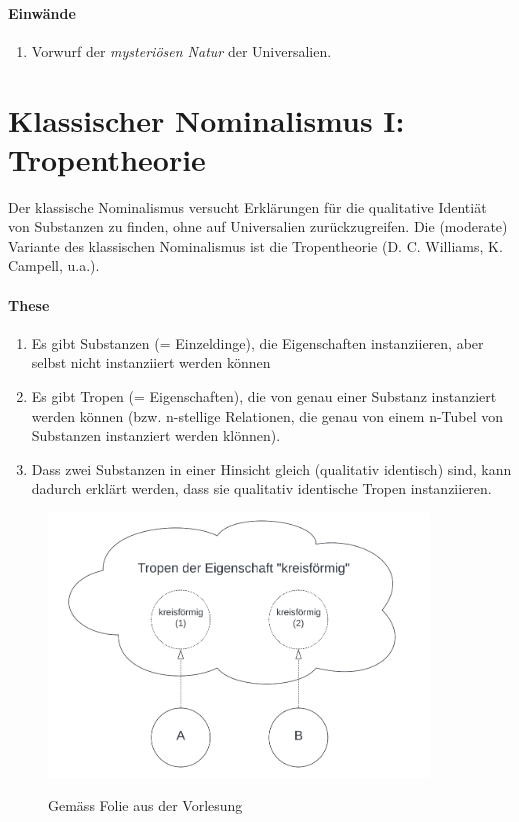 \documentclass[../main.tex]{subfiles}
\begin{document}
\paragraph{Einwände}
\begin{enumerate}
	\item Vorwurf der \textit{mysteriösen Natur} der Universalien.
\end{enumerate}

\section{Klassischer Nominalismus I: Tropentheorie}
Der klassische Nominalismus versucht Erklärungen für die qualitative Identiät von Substanzen zu finden, ohne auf Universalien zurückzugreifen. Die (moderate) Variante des klassischen Nominalismus ist die Tropentheorie (D. C. Williams, K. Campell, u.a.).

\paragraph{These} 
\begin{enumerate}[label=(\alph*)]
	\item Es gibt Substanzen (= Einzeldinge), die Eigenschaften instanziieren, aber selbst nicht instanziiert werden können
	\item Es gibt Tropen (= Eigenschaften), die von genau einer Substanz instanziert werden können (bzw. n-stellige Relationen, die genau von einem n-Tubel von Substanzen instanziert werden klönnen).
	\item Dass zwei Substanzen in einer Hinsicht gleich (qualitativ identisch) sind, kann dadurch erklärt werden, dass sie qualitativ identische Tropen instanziieren. 
\end{enumerate}


\begin{figure}[!htb]
\centering
{\centering\includegraphics[height=7cm]{images/tropen_uebersicht.png}\endcenter}
\caption{Gemäss Folie aus der Vorlesung}
\end{figure}
\end{document}
